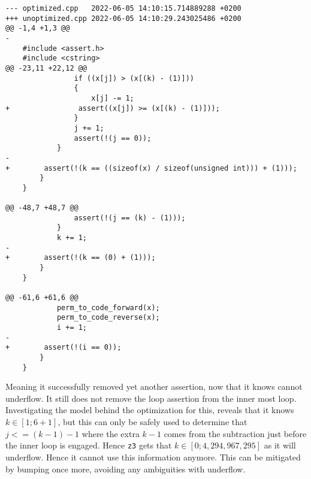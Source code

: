\begin{lstlisting}[label={lst:permmoddiff}, caption={Output from \lsin{diff -u} after modifying
    the loop variable \lsin{k}.}]
--- optimized.cpp	2022-06-05 14:10:15.714889288 +0200
+++ unoptimized.cpp	2022-06-05 14:10:29.243025486 +0200
@@ -1,4 +1,3 @@
-
    #include <assert.h>
    #include <cstring>
@@ -23,11 +22,12 @@
                if ((x[j]) > (x[(k) - (1)]))
                {
                    x[j] -= 1;
+                assert((x[j]) >= (x[(k) - (1)]));
                }
                j += 1;
                assert(!(j == 0));
            }
-        
+        assert(!(k == ((sizeof(x) / sizeof(unsigned int))) + (1)));
        }
    }
    
@@ -48,7 +48,7 @@
                assert(!(j == (k) - (1)));
            }
            k += 1;
-        
+        assert(!(k == (0) + (1)));
        }
    }
    
@@ -61,6 +61,6 @@
            perm_to_code_forward(x);
            perm_to_code_reverse(x);
            i += 1;
-        
+        assert(!(i == 0));
        }
    }
\end{lstlisting}
\noindent
Meaning it successfully removed yet another assertion, now that it knows  cannot underflow.
It still does not remove the loop assertion from the inner most loop. Investigating the model
behind the optimization for this, reveals that it knows $k \in [1;6+1]$, but this can only be
safely used to determine that $j <= (k-1)-1$ where the extra $k-1$ comes from the subtraction
just before the inner loop is engaged. Hence \texttt{z3} gets that $k\in [0;4,294,967,295]$ as it will
underflow. Hence it cannot use this information anymore. This can be mitigated by bumping 
once more, avoiding any ambiguities with underflow.

